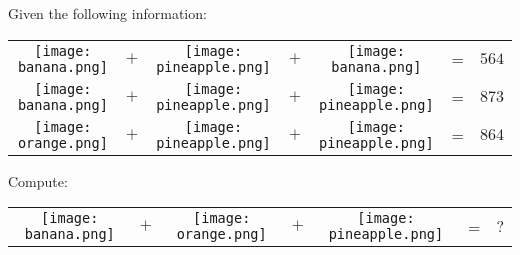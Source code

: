 

\begin{question}
Given the following information:
\begin{center}
\begin{tabular}{ccccccr}
\texttt{[image: banana.png]} & $+$ & \texttt{[image: pineapple.png]} & $+$ & \texttt{[image: banana.png]} & = & $564$ \\
\texttt{[image: banana.png]} & $+$ & \texttt{[image: pineapple.png]} & $+$ & \texttt{[image: pineapple.png]} & = & $873$ \\
\texttt{[image: orange.png]} & $+$ & \texttt{[image: pineapple.png]} & $+$ & \texttt{[image: pineapple.png]} & = & $864$
\end{tabular}
\end{center}

Compute:
\begin{center}
\begin{tabular}{ccccccr}
\texttt{[image: banana.png]} & $+$ & \texttt{[image: orange.png]} & $+$ & \texttt{[image: pineapple.png]} & = & $\text{?}$
\end{tabular}
\end{center}

\end{question}

